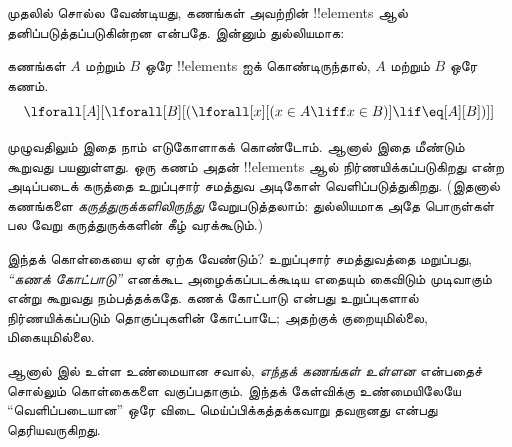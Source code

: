 \documentclass[../../../include/open-logic-section]{subfiles}
\begin{document}

முதலில் சொல்ல வேண்டியது, கணங்கள் அவற்றின் !!{element}s ஆல்
தனிப்படுத்தப்படுகின்றன என்பதே. இன்னும் துல்லியமாக:

\begin{axiom}[உறுப்புசார் சமத்துவம்]
கணங்கள் $A$ மற்றும் $B$ ஒரே !!{element}s ஐக் கொண்டிருந்தால், $A$ மற்றும்
$B$ ஒரே கணம்.
\[
  \lforall[A][\lforall[B][(\lforall[x][(x \in A \liff x \in B)] \lif
  \eq[A][B])]]
\]
\end{axiom}

 முழுவதிலும் இதை நாம் எடுகோளாகக் கொண்டோம். ஆனால்
இதை மீண்டும் கூறுவது பயனுள்ளது. ஒரு கணம் அதன் !!{element}s ஆல்
நிர்ணயிக்கப்படுகிறது என்ற அடிப்படைக் கருத்தை உறுப்புசார் சமத்துவ அடிகோள்
வெளிப்படுத்துகிறது. (இதனால் கணங்களை \emph{கருத்துருக்களிலிருந்து}
வேறுபடுத்தலாம்: துல்லியமாக அதே பொருள்கள் பல வேறு கருத்துருக்களின் கீழ்
வரக்கூடும்.)

இந்தக் கொள்கையை ஏன் ஏற்க வேண்டும்? உறுப்புசார் சமத்துவத்தை மறுப்பது,
\emph{“கணக் கோட்பாடு”} எனக்கூட அழைக்கப்படக்கூடிய எதையும் கைவிடும் முடிவாகும்
என்று கூறுவது நம்பத்தக்கதே. கணக் கோட்பாடு என்பது உறுப்புகளால்
நிர்ணயிக்கப்படும் தொகுப்புகளின் கோட்பாடே; அதற்குக் குறையுமில்லை,
மிகையுமில்லை.

ஆனால்  இல் உள்ள உண்மையான சவால், \emph{எந்தக் கணங்கள்
உள்ளன} என்பதைச் சொல்லும் கொள்கைகளை வகுப்பதாகும். இந்தக் கேள்விக்கு
உண்மையிலேயே “வெளிப்படையான” ஒரே விடை மெய்ப்பிக்கத்தக்கவாறு தவறானது
என்பது தெரியவருகிறது.
\end{document}
